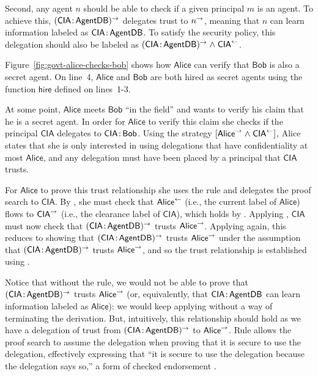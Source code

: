 Second, any agent $n$ should be able to check if a given principal $m$ is an agent. To achieve this, $(\mathsf{CIA} \colon \!\mathsf{AgentDB})^{\rightarrow}$ delegates trust to $n^{\rightarrow}$, meaning that $n$ can learn information labeled as $\mathsf{CIA} \colon \!\mathsf{AgentDB}$. To satisfy the security policy, this delegation should also be labeled as $(\mathsf{CIA} \colon \!\mathsf{AgentDB})^{\rightarrow} \mathrel{\land} \mathsf{CIA}^{\leftarrow}$.

Figure~\ref{fig:govt-alice-checks-bob} shows how $\mathsf{Alice}$ can verify that $\mathsf{Bob}$ is also a secret agent. On line~4, $\mathsf{Alice}$ and $\mathsf{Bob}$ are both hired as secret agents using the function $\mathsf{hire}$ defined on lines~1-3. 

At some point, $\mathsf{Alice}$ meets $\mathsf{Bob}$ ``in the field'' and wants to verify his claim that he is a secret agent. In order for $\mathsf{Alice}$ to verify this claim she checks if the principal $\mathsf{CIA}$ delegates to $\mathsf{CIA} \colon \!\mathsf{Bob}$. Using the strategy $[\mathsf{Alice}^{\rightarrow} \mathrel{\land} \mathsf{CIA}^{\leftarrow}]$, Alice states that she is only interested in using delegations that have confidentiality at most $\mathsf{Alice}$, and any delegation must have been placed by a principal that $\mathsf{CIA}$ trusts.

For $\mathsf{Alice}$ to prove this trust relationship she uses the  rule and delegates the proof search to $\mathsf{CIA}$. By , she must check that $\mathsf{Alice}^{\leftarrow}$ (i.e., the current label of $\mathsf{Alice}$) flows to $\mathsf{CIA}^{\rightarrow}$ (i.e., the clearance label of $\mathsf{CIA}$), which holds by . Applying , $\mathsf{CIA}$ must now check that $(\mathsf{CIA} \colon \!\mathsf{AgentDB})^{\rightarrow}$ trusts $\mathsf{Alice}^{\rightarrow}$. Applying  again, this reduces to showing that $(\mathsf{CIA} \colon \!\mathsf{AgentDB})^{\rightarrow}$ trusts $\mathsf{Alice}^{\rightarrow}$ under the assumption that $(\mathsf{CIA} \colon \!\mathsf{AgentDB})^{\rightarrow}$ trusts $\mathsf{Alice}^{\rightarrow}$, and so the trust relationship is established using .

Notice that without the  rule, we would not be able to prove that $(\mathsf{CIA} \colon \!\mathsf{AgentDB})^{\rightarrow}$ trusts $\mathsf{Alice}^{\rightarrow}$ (or, equivalently, that $\mathsf{CIA} \colon \!\mathsf{AgentDB}$ can learn information labeled as $\mathsf{Alice}$): we would keep applying  without a way of terminating the derivation. But, intuitively, this relationship should hold as we have a delegation of trust from $(\mathsf{CIA} \colon \!\mathsf{AgentDB})^{\rightarrow}$ to $\mathsf{Alice}^{\rightarrow}$.
Rule   allows the proof search to assume the delegation when proving that it is secure to use the delegation, effectively expressing that ``it is secure to use the delegation because the delegation says so,'' a form of checked endorsement \cite{Chong:2007:SWA:1294261.1294265, DBLP:journals/corr/abs-1107-5594}.

